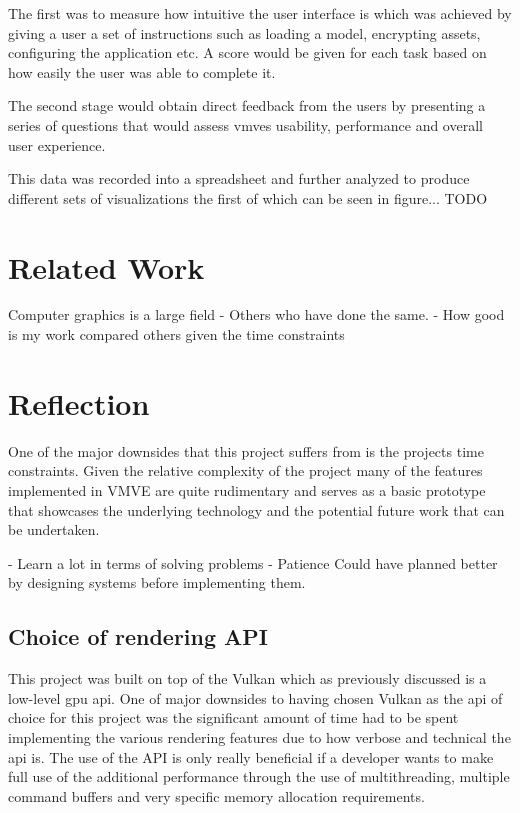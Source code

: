 \documentclass[11pt]{article}
\begin{document}
The first was to measure how intuitive the user interface is which was achieved
by giving a user a set of instructions such as loading a model, encrypting
assets, configuring the application etc. A score would be given for each task
based on how easily the user was able to complete it.

The second stage would obtain direct feedback from the users by presenting a
series of questions that would assess \glspl{vmve} usability, performance and
overall user experience.

This data was recorded into a spreadsheet and further analyzed to produce different
sets of visualizations the first of which can be seen in figure... TODO


\section{Related Work}
Computer graphics is a large field 
- Others who have done the same.
- How good is my work compared others given the time constraints

\section{Reflection}

One of the major downsides that this project suffers from is the projects time
constraints. Given the relative complexity of the project many of the features
implemented in VMVE are quite rudimentary and serves as a basic prototype that
showcases the underlying technology and the potential future work that can be
undertaken.



- Learn a lot in terms of solving problems
- Patience
Could have planned better by designing systems before implementing them.


\subsection{Choice of rendering API}
This project was built on top of the Vulkan which as previously discussed is a
low-level \gls{gpu} \gls{api}. One of major downsides to having chosen Vulkan as
the \gls{api} of choice for this project was the significant amount of time had
to be spent implementing the various rendering features due to how verbose and
technical the \gls{api} is. The use of the API is only really beneficial if a
developer wants to make full use of the additional performance through the use
of multithreading, multiple command buffers and very specific memory allocation
requirements.
\end{document}

